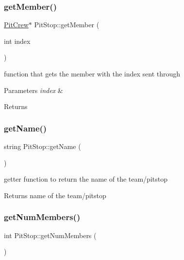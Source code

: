 \subsubsection{\texorpdfstring{get\+Member()}{getMember()}}
{\footnotesize\ttfamily \mbox{\hyperlink{class_pit_crew}{Pit\+Crew}}$\ast$ Pit\+Stop\+::get\+Member (\begin{DoxyParamCaption}\item[{int}]{index }\end{DoxyParamCaption})\hspace{0.3cm}{\ttfamily [inline]}}

function that gets the member with the index sent through 
\begin{DoxyParams}{Parameters}
{\em index} & \\
\hline
\end{DoxyParams}
\begin{DoxyReturn}{Returns}

\end{DoxyReturn}
\mbox{\label{class_pit_stop_a84ba8d88f9995a144e65f5528d1f64ff}} 
\subsubsection{\texorpdfstring{get\+Name()}{getName()}}
{\footnotesize\ttfamily string Pit\+Stop\+::get\+Name (\begin{DoxyParamCaption}{ }\end{DoxyParamCaption})}

getter function to return the name of the team/pitstop \begin{DoxyReturn}{Returns}
name of the team/pitstop 
\end{DoxyReturn}
\mbox{\label{class_pit_stop_acfbfcd3895366420857b8eef5cb5eac9}} 
\subsubsection{\texorpdfstring{get\+Num\+Members()}{getNumMembers()}}
{\footnotesize\ttfamily int Pit\+Stop\+::get\+Num\+Members (\begin{DoxyParamCaption}{ }\end{DoxyParamCaption})\hspace{0.3cm}{\ttfamily [inline]}}

